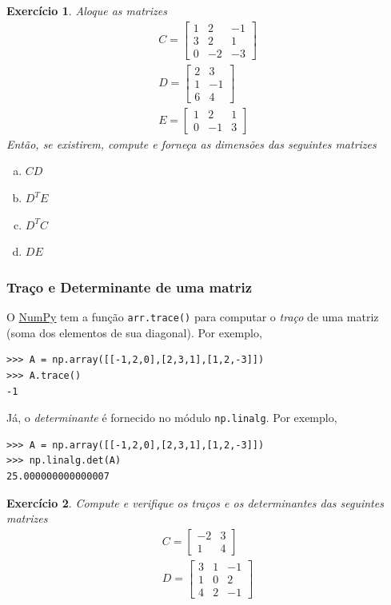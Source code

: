 \documentclass[12pt]{article}
\newtheorem{exr}{Exercício}[section]
\begin{document}
\begin{exr}
  Aloque as matrizes
  \begin{gather}
    C =
    \begin{bmatrix}
      1 & 2 & -1 \\
      3 & 2 & 1 \\
      0 & -2 & -3
    \end{bmatrix}\\
    D =
    \begin{bmatrix}
      2 & 3 \\
      1 & -1 \\
      6 & 4
    \end{bmatrix}\\
    E =
    \begin{bmatrix}
      1 & 2 & 1 \\
      0 & -1 & 3
    \end{bmatrix}
  \end{gather}
  Então, se existirem, compute e forneça as dimensões das seguintes matrizes
  \begin{enumerate}[a)]
  \item $CD$
  \item $D^TE$
  \item $D^TC$
  \item $DE$
  \end{enumerate}
\end{exr}

\subsubsection{Traço e Determinante de uma matriz}

O \href{https://numpy.org/}{NumPy} tem a função \lstinline+arr.trace()+ para computar o \emph{traço} de uma matriz (soma dos elementos de sua diagonal). Por exemplo,
\begin{lstlisting}
>>> A = np.array([[-1,2,0],[2,3,1],[1,2,-3]])
>>> A.trace()
-1
\end{lstlisting}
Já, o \emph{determinante} é fornecido no módulo \lstinline+np.linalg+. Por exemplo,
\begin{lstlisting}
>>> A = np.array([[-1,2,0],[2,3,1],[1,2,-3]])
>>> np.linalg.det(A)
25.000000000000007
\end{lstlisting}

\begin{exr}
  Compute e verifique os traços e os determinantes das seguintes matrizes
  \begin{gather}
    C =
    \begin{bmatrix}
      -2 & 3 \\
      1 & 4
    \end{bmatrix}\\
    D =
    \begin{bmatrix}
      3 & 1 & -1 \\
      1 & 0 & 2 \\
      4 & 2 & -1
    \end{bmatrix}
  \end{gather}
\end{exr}
\end{document}
